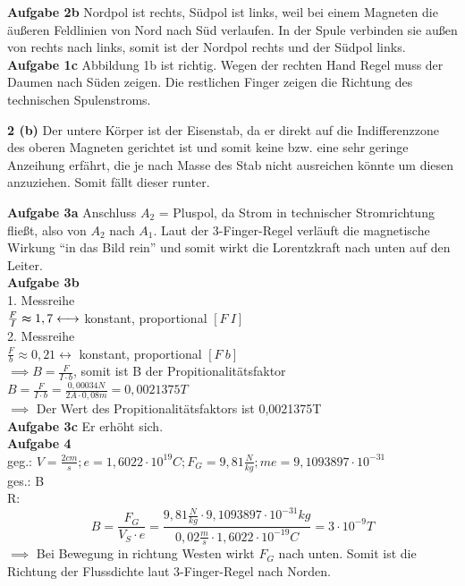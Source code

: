 \documentclass{report}
\begin{document}
\textbf{Aufgabe 2b} Nordpol ist rechts, Südpol ist links, weil bei einem
Magneten die äußeren Feldlinien von Nord nach Süd verlaufen. In der Spule
verbinden sie außen von rechts nach links, somit ist der Nordpol rechts und der
Südpol links.\\ \textbf{Aufgabe 1c} Abbildung 1b ist richtig. Wegen der rechten
Hand Regel muss der Daumen nach Süden zeigen. Die restlichen Finger zeigen die
Richtung des technischen Spulenstroms.



\noindent \textbf{2 (b)} Der untere Körper ist der Eisenstab, da er direkt auf
die Indifferenzzone des oberen Magneten gerichtet ist und somit keine bzw. eine
sehr geringe Anzeihung erfährt, die je nach Masse des Stab nicht ausreichen
könnte um diesen anzuziehen. Somit fällt dieser runter.

\noindent\textbf{Aufgabe 3a} Anschluss $A_2$ = Pluspol, da Strom in technischer
Stromrichtung fließt, also von $A_2$ nach $A_1$. Laut der 3-Finger-Regel
verläuft die magnetische Wirkung ``in das Bild rein'' und somit wirkt die
Lorentzkraft nach unten auf den Leiter.\\ \textbf{Aufgabe 3b}\\ 1. Messreihe\\
$\frac{F}{I}\thickapprox 1,7 \longleftrightarrow$ konstant, proportional
$[F~I]$\\ 2. Messreihe\\ $\frac{F}{b}\approx 0,21 \longleftrightarrow$
konstant, proportional $[F~b]$\\ $\implies B=\frac{F}{I\cdot b}$, somit ist B der
Propitionalitätsfaktor\\
$B=\frac{F}{I\cdot b}=\frac{0,00034N}{2A\cdot 0,08m}=0,0021375T$\\ $\implies$ Der Wert
des Propitionalitätsfaktors ist 0,0021375T\\ \textbf{Aufgabe 3c} Er erhöht
sich.\\ \textbf{Aufgabe 4}\\ geg.: $V=\frac{2cm}{s}; e=1,6022\cdot 10^{19}C;
F_G=9,81\frac{N}{kg}; me=9,1093897\cdot 10^{-31}$\\ ges.: B\\ R:
\[B=\frac{F_G}{V_S\cdot e}=\frac{9,81\frac{N}{kg}\cdot 9,1093897\cdot 10^{-31}kg}{0,02\frac{m}{s}\cdot 1,6022\cdot 10^{-19}C}=3\cdot 10^{-9}T\]
$\implies$ Bei Bewegung in richtung Westen wirkt $F_G$ nach unten. Somit ist
die Richtung der Flussdichte laut 3-Finger-Regel nach Norden. \clearpage
\end{document}
